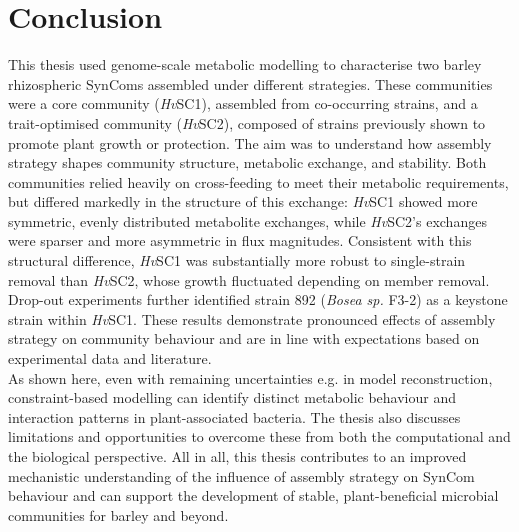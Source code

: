 \chapter{Conclusion}

This thesis used genome-scale metabolic modelling to characterise two barley rhizospheric SynComs assembled under different strategies. These communities were a core community (\textit{Hv}SC1), assembled from co-occurring strains, and a trait-optimised community (\textit{Hv}SC2), composed of strains previously shown to promote plant growth or protection. The aim was to understand how assembly strategy shapes community structure, metabolic exchange, and stability.
Both communities relied heavily on cross-feeding to meet their metabolic requirements, but differed markedly in the structure of this exchange: \textit{Hv}SC1 showed more symmetric, evenly distributed metabolite exchanges, while \textit{Hv}SC2's exchanges were sparser and more asymmetric in flux magnitudes. Consistent with this structural difference, \textit{Hv}SC1 was substantially more robust to single-strain removal than \textit{Hv}SC2, whose growth fluctuated depending on member removal. Drop-out experiments further identified strain 892 (\textit{Bosea sp.} F3-2) as a keystone strain within \textit{Hv}SC1. These results demonstrate pronounced effects of assembly strategy on community behaviour and are in line with expectations based on experimental data and literature. 
\\


As shown here, even with remaining uncertainties e.g. in model reconstruction, constraint-based modelling can identify distinct metabolic behaviour and interaction patterns in plant-associated bacteria. The thesis also discusses limitations and opportunities to overcome these from both the computational and the biological perspective. All in all, this thesis contributes to an improved mechanistic understanding of the influence of assembly strategy on SynCom behaviour and can support the development of stable, plant-beneficial microbial communities for barley and beyond.
